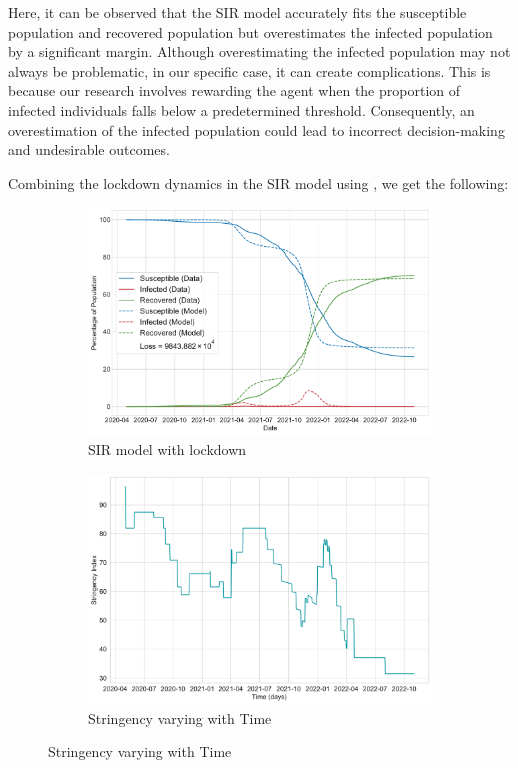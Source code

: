 \documentclass[tikz,fleqn,12pt]{wlscirep}
\begin{document}
Here, it can be observed that the SIR model accurately fits the susceptible population and recovered population but overestimates the infected population by a significant margin. Although overestimating the infected population may not always be problematic, in our specific case, it can create complications. This is because our research involves rewarding the agent when the proportion of infected individuals falls below a predetermined threshold. Consequently, an overestimation of the infected population could lead to incorrect decision-making and undesirable outcomes.

Combining the lockdown dynamics in the SIR model using , we get the following:
\begin{figure}[htbp!]
  \centering
  \caption{SIR Model with lockdown for India}

  \begin{subfigure}[t]{\textwidth}
    \centering
    \includegraphics[scale=0.50]{images/SIR_model_with_lockdown_IND.pdf}
    \caption{SIR model with lockdown}
    \label{fig:SIR_model_with_lockdown_IND}
  \end{subfigure}
  
  \begin{subfigure}[t]{\textwidth}
    \centering
    \includegraphics[scale=0.50]{images/stringency_varying_with_time_IND.pdf}
    \caption{Stringency varying with Time}
    \label{fig:stringency_varying_with_time_IND}
  \end{subfigure}
\end{figure}
\end{document}
